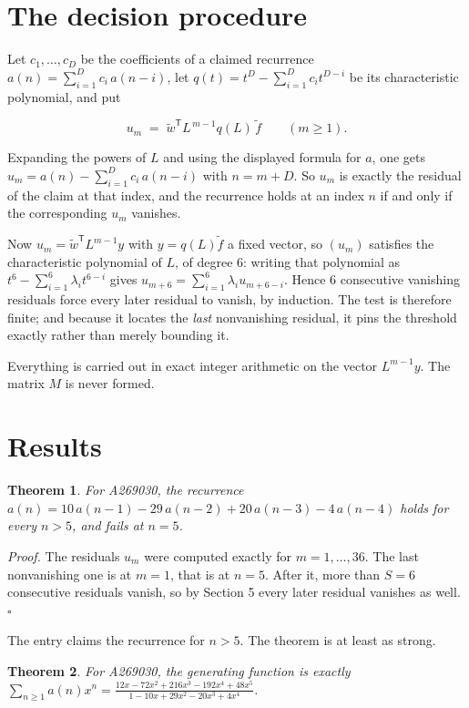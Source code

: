 \documentclass[11pt]{article}
\newtheorem{theorem}{Theorem}
\theoremstyle{definition}
\begin{document}
\section{The decision procedure}

Let $c_1,\dots,c_D$ be the coefficients of a claimed recurrence $a(n) = \sum_{i=1}^{D} c_i\,a(n-i)$, let $q(t) = t^{D} - \sum_{i=1}^{D} c_i t^{D-i}$ be its characteristic polynomial, and put

\[u_m \;=\; \tilde w^{\mathsf T} L^{\,m-1} q(L)\,\tilde f \qquad (m \ge 1).\]

Expanding the powers of $L$ and using the displayed formula for $a$, one gets $u_m = a(n) - \sum_{i=1}^{D} c_i\,a(n-i)$ with $n = m + D$. So $u_m$ is exactly the residual of the claim at that index, and the recurrence holds at an index $n$ if and only if the corresponding $u_m$ vanishes.

Now $u_m = \tilde w^{\mathsf T} L^{m-1} y$ with $y = q(L)\tilde f$ a fixed vector, so $(u_m)$ satisfies the characteristic polynomial of $L$, of degree $6$: writing that polynomial as $t^{6} - \sum_{i=1}^{6} \lambda_i t^{6-i}$ gives $u_{m+6} = \sum_{i=1}^{6} \lambda_i u_{m+6-i}$. Hence $6$ consecutive vanishing residuals force every later residual to vanish, by induction. The test is therefore finite; and because it locates the {\itshape last} nonvanishing residual, it pins the threshold exactly rather than merely bounding it.

Everything is carried out in exact integer arithmetic on the vector $L^{m-1}y$. The matrix $M$ is never formed.

\section{Results}

\begin{theorem} For A269030, the recurrence $a(n) = 10\,a(n-1) - 29\,a(n-2) + 20\,a(n-3) - 4\,a(n-4)$ holds for every $n > 5$, and fails at $n = 5$.\end{theorem}

{\itshape Proof.} The residuals $u_m$ were computed exactly for $m = 1,\dots,36$. The last nonvanishing one is at $m = 1$, that is at $n = 5$. After it, more than $S = 6$ consecutive residuals vanish, so by Section 5 every later residual vanishes as well. $\square$

The entry claims the recurrence for $n > 5$. The theorem is at least as strong.

\begin{theorem} For A269030, the generating function is exactly $\sum_{n\ge 1} a(n)x^n = \frac{12x - 72x^{2} + 216x^{3} - 192x^{4} + 48x^{5}}{1 - 10x + 29x^{2} - 20x^{3} + 4x^{4}}$.\end{theorem}
\end{document}
